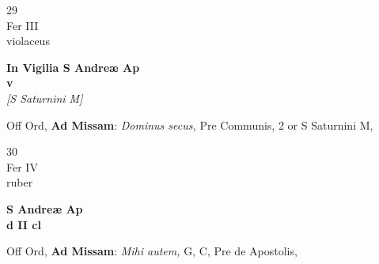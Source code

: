 \documentclass[10pt, openany]{book}
\begin{document}
        \begin{center}
            \begin{minipage}{3.5in}
                \vspace{2em}
                \begin{minipage}{0.5in}
                    {\Huge 29} \\
                    {\normalsize Fer III} \\
                    {\normalsize violaceus}
                \end{minipage}
                \begin{minipage}{3.0in}
                    \textbf{ \large In Vigilia S Andreæ Ap \\
                    \textnormal{\normalsize v}} \\ \textit{[S Saturnini M]} \\ 
                \end{minipage}
                \begin{justify}Off Ord, \textbf{Ad Missam}: \textit{Dominus secus,} Pre Communis, 2 or S Saturnini M,   
                \end{justify}
            \end{minipage}
        \end{center}
    
        \begin{center}
            \begin{minipage}{3.5in}
                \vspace{2em}
                \begin{minipage}{0.5in}
                    {\Huge 30} \\
                    {\normalsize Fer IV} \\
                    {\normalsize ruber}
                \end{minipage}
                \begin{minipage}{3.0in}
                    \textbf{ \large S Andreæ Ap \\
                    \textnormal{\normalsize d II cl}} \\ 
                \end{minipage}
                \begin{justify}Off Ord, \textbf{Ad Missam}: \textit{Mihi autem,} G, C, Pre de Apostolis,   
                \end{justify}
            \end{minipage}
        \end{center}
    
\end{document}
